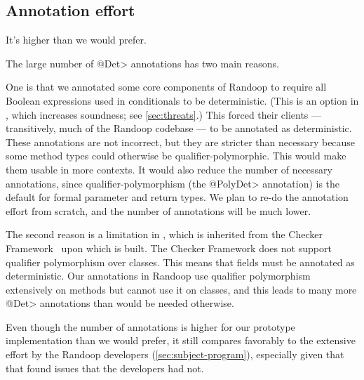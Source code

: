 

\subsection{Annotation effort}



It's higher than we would prefer.

The large number of \<@Det> annotations has two main reasons.

One is that we annotated some core components of Randoop to require all
Boolean expressions used in conditionals to be deterministic.  (This is an
option in \theDeterminismCheckerImplementation, which increases soundness;
see \cref{sec:threats}.)  This forced
their clients --- transitively, much of the Randoop codebase --- to be
annotated as deterministic.
These annotations are not incorrect, but they are stricter than necessary
because some method types could otherwise be qualifier-polymorphic.
This would make them usable in more contexts.  It would also reduce the
number of necessary annotations, since qualifier-polymorphism (the
\<@PolyDet> annotation) is the default for
formal parameter and return types.  We plan to re-do the annotation effort
from scratch, and the number of annotations will be much lower.

The second reason is a limitation in \theDeterminismCheckerImplementation,
which is inherited from the Checker Framework~\cite{checker-framework-tool} upon which
\theDeterminismChecker is built.
The Checker Framework does not support qualifier polymorphism over
classes.  This means that fields must be annotated as deterministic.  Our annotations in
Randoop use qualifier polymorphism extensively on methods but cannot use it
on classes, and this leads to many more \<@Det> annotations than would be
needed otherwise.


Even though the number of annotations is higher for our prototype
implementation than we would prefer, it still compares favorably to the
extensive effort by the Randoop developers (\cref{sec:subject-program}),
especially given that that \theDeterminismChecker found issues that the
developers had not.

